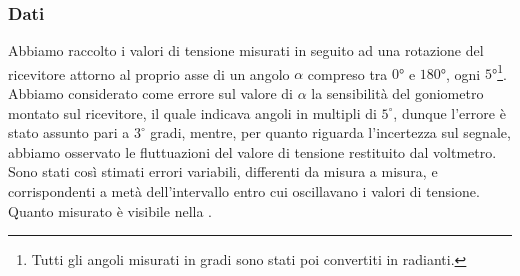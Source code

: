 \documentclass[a4paper]{article}
\begin{document}
\subsubsection{Dati}
Abbiamo raccolto i valori di tensione misurati in seguito ad una rotazione del ricevitore attorno al proprio asse di un angolo $\alpha$ compreso tra $\ang{0}$ e $\ang{180}$, 
ogni $\ang{5}$\footnote{Tutti gli angoli misurati in gradi sono stati poi convertiti in radianti.}. 
Abbiamo considerato come errore sul valore di $\alpha$ la sensibilità del goniometro montato sul ricevitore, il quale indicava angoli in multipli di $5^\circ$, 
dunque l'errore è stato assunto pari a $3^\circ$ gradi, mentre, per quanto riguarda l'incertezza sul segnale, abbiamo osservato le fluttuazioni del valore di tensione restituito dal voltmetro. 
Sono stati così stimati errori variabili, differenti da misura a misura, e corrispondenti a metà dell'intervallo entro cui oscillavano i valori di tensione.
Quanto misurato è visibile nella .
\end{document}
